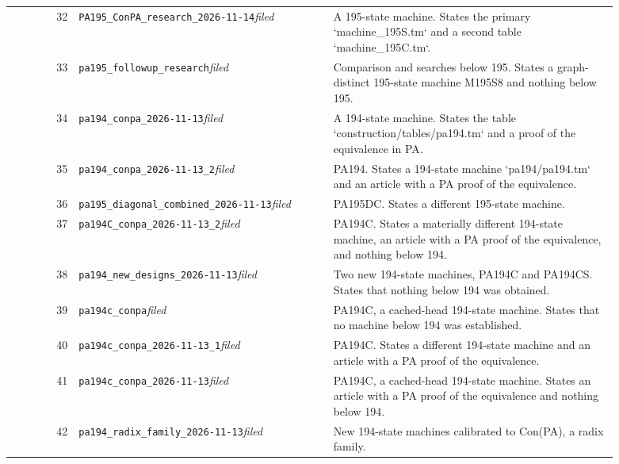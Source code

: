 \begin{longtable}{@{}rp{0.42\linewidth}p{0.47\linewidth}@{}}
32 & \nolinkurl{PA195_ConPA_research_2026-11-14}\newline\emph{filed} & A 195-state machine. States the primary `machine\_195S.tm` and a second table `machine\_195C.tm`. \\[2pt]
33 & \nolinkurl{pa195_followup_research}\newline\emph{filed} & Comparison and searches below 195. States a graph-distinct 195-state machine M195S8 and nothing below 195. \\[2pt]
34 & \nolinkurl{pa194_conpa_2026-11-13}\newline\emph{filed} & A 194-state machine. States the table `construction/tables/pa194.tm` and a proof of the equivalence in PA. \\[2pt]
35 & \nolinkurl{pa194_conpa_2026-11-13_2}\newline\emph{filed} & PA194. States a 194-state machine `pa194/pa194.tm` and an article with a PA proof of the equivalence. \\[2pt]
36 & \nolinkurl{pa195_diagonal_combined_2026-11-13}\newline\emph{filed} & PA195DC. States a different 195-state machine. \\[2pt]
37 & \nolinkurl{pa194C_conpa_2026-11-13_2}\newline\emph{filed} & PA194C. States a materially different 194-state machine, an article with a PA proof of the equivalence, and nothing below 194. \\[2pt]
38 & \nolinkurl{pa194_new_designs_2026-11-13}\newline\emph{filed} & Two new 194-state machines, PA194C and PA194CS. States that nothing below 194 was obtained. \\[2pt]
39 & \nolinkurl{pa194c_conpa}\newline\emph{filed} & PA194C, a cached-head 194-state machine. States that no machine below 194 was established. \\[2pt]
40 & \nolinkurl{pa194c_conpa_2026-11-13_1}\newline\emph{filed} & PA194C. States a different 194-state machine and an article with a PA proof of the equivalence. \\[2pt]
41 & \nolinkurl{pa194c_conpa_2026-11-13}\newline\emph{filed} & PA194C, a cached-head 194-state machine. States an article with a PA proof of the equivalence and nothing below 194. \\[2pt]
42 & \nolinkurl{pa194_radix_family_2026-11-13}\newline\emph{filed} & New 194-state machines calibrated to Con(PA), a radix family. \\[2pt]

\end{longtable}
